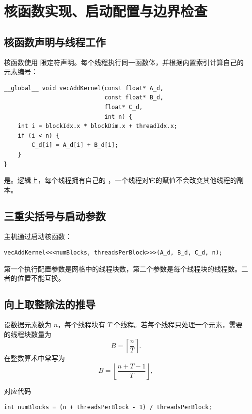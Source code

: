 \section{核函数实现、启动配置与边界检查}

\subsection{核函数声明与线程工作}

\par\noindent\begin{minipage}{\linewidth}
核函数使用  限定符声明。每个线程执行同一函数体，并根据内置索引计算自己的元素编号：

\begin{lstlisting}[style=cuda]
__global__ void vecAddKernel(const float* A_d,
                             const float* B_d,
                             float* C_d,
                             int n) {
    int i = blockIdx.x * blockDim.x + threadIdx.x;
    if (i < n) {
        C_d[i] = A_d[i] + B_d[i];
    }
}
\end{lstlisting}
\end{minipage}\par

 是。逻辑上，每个线程拥有自己的 ，一个线程对它的赋值不会改变其他线程的副本。

\subsection{三重尖括号与启动参数}

\par\noindent\begin{minipage}{\linewidth}
主机通过启动核函数：
\begin{lstlisting}[style=cuda,numbers=none]
vecAddKernel<<<numBlocks, threadsPerBlock>>>(A_d, B_d, C_d, n);
\end{lstlisting}
\end{minipage}\par
第一个执行配置参数是网格中的线程块数，第二个参数是每个线程块的线程数。二者的位置不能互换。

\subsection{向上取整除法的推导}

设数据元素数为 $n$，每个线程块有 $T$ 个线程。若每个线程只处理一个元素，需要的线程块数量为
\[
B=\left\lceil\frac{n}{T}\right\rceil.
\]
在整数算术中常写为
\[
\boxed{B=\left\lfloor\frac{n+T-1}{T}\right\rfloor},
\]
\par\noindent\begin{minipage}{\linewidth}
对应代码
\begin{lstlisting}[style=cuda,numbers=none]
int numBlocks = (n + threadsPerBlock - 1) / threadsPerBlock;
\end{lstlisting}
\end{minipage}\par

